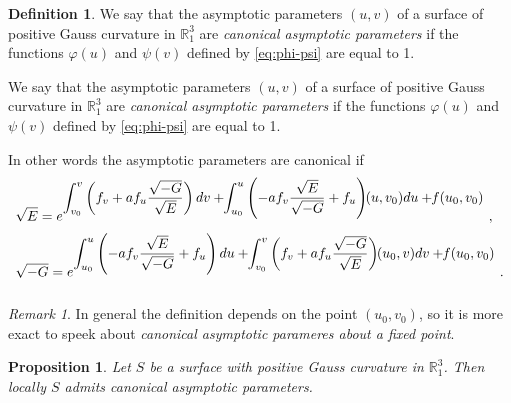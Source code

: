 \documentclass[12pt]{amsart}
\newcommand{\R}{\mathbb R}
\newtheorem{prop}[thm]{Proposition}
\theoremstyle{definition}
\newtheorem{defn}[thm]{Definition}
\theoremstyle{remark}
\newtheorem{remark}{Remark}[section]
\newcommand{\ds}{\displaystyle}
\begin{document}
\begin{defn} \label{D:def-can}
 We say that the asymptotic parameters $(u,v)$ of a surface of positive Gauss curvature in $\R^3_1$ are {\it canonical asymptotic parameters}
if the functions $\varphi(u)$ and $\psi(v)$ defined by \eqref{eq:phi-psi} are equal to 1.  
\end{defn}

\begin{def} \label{D:def-can}
 We say that the asymptotic parameters $(u,v)$ of a surface of positive Gauss curvature in $\R^3_1$ are {\it canonical asymptotic parameters}
if the functions $\varphi(u)$ and $\psi(v)$ defined by \eqref{eq:phi-psi} are equal to 1.  
\end{def}


In other words the  asymptotic parameters are canonical if
$$
	\begin{array}{l} 
		\vspace{2mm}
		\ds \sqrt E=e^{\ds \int_{v_0}^v\left(f_v+af_u\frac{\sqrt{-G}}{\sqrt E}\right)dv
		                +\hspace{-1mm}\int_{u_0}^u\left(-af_v\frac{\sqrt E}{\sqrt{-G}}+f_u\right)\hspace{-1mm}(u,v_0)du +\hspace{-1mm}f(u_0,v_0)} \ ,  \\
		\vspace{2mm}
		\ds \sqrt{-G}=e^{\ds \int_{u_0}^u\left(-af_v\frac{\sqrt E}{\sqrt{-G}}+f_u\right)du
		                +\hspace{-1mm}\int_{v_0}^v\left(f_v+af_u\frac{\sqrt{-G}}{\sqrt E}\right)\hspace{-1mm}(u_0,v)dv  +\hspace{-1mm}f(u_0,v_0)} \ .
	\end{array}   
$$

\begin{remark}In general the definition depends on the point $(u_0,v_0)$, so it is more exact
to speek about {\it canonical asymptotic parameres about a fixed point}.
\end{remark}

\begin{prop} \label{eq:ExistenceCanonicalParameters}
Let $S$ be a surface with positive Gauss curvature in $\mathbb R^3_1$. Then locally $S$ admits 
canonical asymptotic parameters.
\end{prop}
\end{document}
